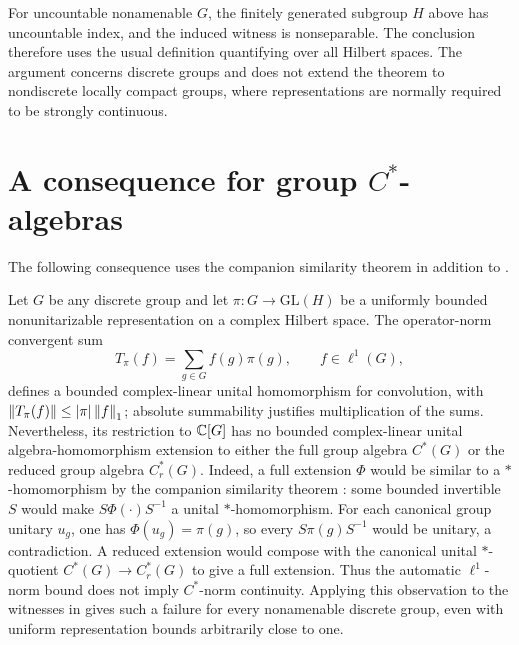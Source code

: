 For uncountable nonamenable \(G\), the finitely generated subgroup \(H\) above has
uncountable index, and the induced witness is nonseparable. The conclusion
therefore uses the usual definition quantifying over all Hilbert spaces.
The argument concerns discrete groups and does not extend the theorem to
nondiscrete locally compact groups, where representations are normally
required to be strongly continuous.

\section{A consequence for group \texorpdfstring{$C^*$}{C*}-algebras}
\label{sec:cstar-consequence}

The following consequence uses the companion similarity theorem in
addition to .

Let \(G\) be any discrete group and let
\(\pi:G\to\mathrm{GL}(H)\) be a uniformly bounded nonunitarizable
representation on a complex Hilbert space. The operator-norm convergent sum
\[
 T_\pi(f)=\sum_{g\in G}f(g)\pi(g),\qquad f\in\ell^1(G),
\]
defines a bounded complex-linear unital homomorphism for convolution, with
\(\left\lVert T_\pi(f)\right\rVert\le|\pi|\left\lVert f\right\rVert_1\); absolute summability justifies
multiplication of the sums. Nevertheless, its restriction to \(\mathbb C[G]\)
has no bounded complex-linear unital algebra-homomorphism extension to
either the full group algebra \(C^*(G)\) or the reduced group algebra
\(C_r^*(G)\). Indeed, a full extension \(\Phi\) would be similar to a
\(*\)-homomorphism by the companion similarity theorem
\cite[Theorem~1.1]{OpenAIKadison2026}: some bounded invertible \(S\)
would make \(S\Phi(\cdot)S^{-1}\) a unital \(*\)-homomorphism.
For each canonical group unitary \(u_g\), one has \(\Phi(u_g)=\pi(g)\),
so every \(S\pi(g)S^{-1}\) would be unitary, a contradiction.
A reduced extension would compose with the canonical unital
\(*\)-quotient \(C^*(G)\to C_r^*(G)\) to give a full extension.
Thus the automatic \(\ell^1\)-norm bound does not imply
\(C^*\)-norm continuity. Applying this observation to the witnesses in
 gives such a failure for every nonamenable discrete
group, even with uniform representation bounds arbitrarily close to one.

